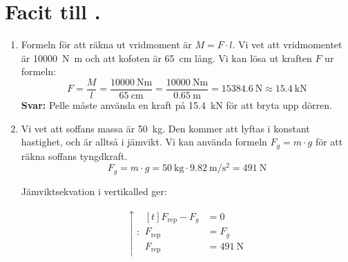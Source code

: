 \documentclass[11pt]{article}
\begin{document}
\raggedright

\section*{Facit till \lessonNumber. \lessonName}
\begin{enumerate}[itemsep=2em]
        \item
              \raggedright
              Formeln för att räkna ut vridmoment är $M = F \cdot l$. Vi vet att vridmomentet är \SI{10 000}{\newton\meter} och att kofoten är \SI{65}{\centi\meter} lång. Vi kan lösa ut kraften $F$ ur formeln:
              \begin{equation*}
                      F = \frac{M}{l} = \frac{\SI{10 000}{\newton\meter}}{\SI{65}{\centi\meter}} = \frac{{\SI{10 000}{\newton\meter}}}{{\SI{0.65}{\meter}}} = \SI{15384.6}{\newton} \approx \SI{15.4}{\kilo\newton}
              \end{equation*}
              \textbf{Svar:} Pelle måste använda en kraft på \SI{15.4}{\kilo\newton} för att bryta upp dörren.
        \item
              \raggedright
              Vi vet att soffans massa är \SI{50}{\kilo\gram}. Den kommer att lyftas i konstant hastighet, och är alltså i jämvikt. Vi kan använda formeln $F_g = m \cdot g$ för att räkna soffans tyngdkraft.
              \begin{equation*}
                      F_g = m \cdot g = \SI{50}{\kilo\gram} \cdot \SI{9.82}{\meter\per\second\squared} = \SI{491}{\newton}
              \end{equation*}
              \begin{minipage}[c]{0.4\textwidth}
                      Jämviktsekvation i vertikalled ger:
              \end{minipage}
              \begin{minipage}[c]{0.4\textwidth}
                      \begin{align*}
                              \uparrow : \begin{aligned}[t]
                                                 F_{\text{rep}} - F_g & = 0                 \\
                                                 F_{\text{rep}}       & = F_g               \\
                                                 F_{\text{rep}}       & = \SI{491}{\newton}
                                         \end{aligned}
                      \end{align*}
              \end{minipage}


\end{enumerate}
\end{document}
